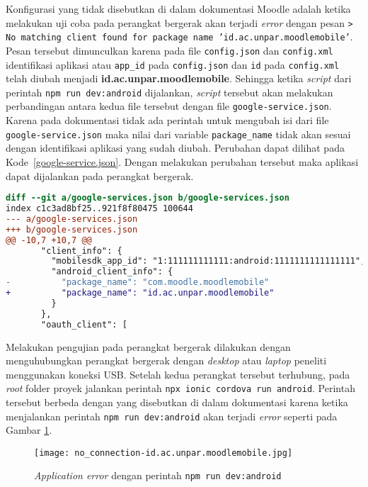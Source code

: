 Konfigurasi yang tidak disebutkan di dalam dokumentasi Moodle adalah ketika melakukan uji coba pada perangkat bergerak akan terjadi \textit{error} dengan pesan \texttt{> No matching client found for package name 'id.ac.unpar.moodlemobile'}. Pesan tersebut dimunculkan karena pada file \texttt{config.json} dan \texttt{config.xml} identifikasi aplikasi atau \texttt{app\_id} pada \texttt{config.json} dan \texttt{id} pada \texttt{config.xml} telah diubah menjadi \textbf{id.ac.unpar.moodlemobile}. Sehingga ketika \textit{script} dari perintah \texttt{npm run dev:android} dijalankan, \textit{script} tersebut akan melakukan perbandingan antara kedua file tersebut dengan file \texttt{google-service.json}. Karena pada dokumentasi tidak ada perintah untuk mengubah isi dari file \texttt{google-service.json} maka nilai dari variable \texttt{package\_name} tidak akan sesuai dengan identifikasi aplikasi yang sudah diubah. Perubahan dapat dilihat pada \mbox{Kode \ref{google-service.json}}. Dengan melakukan perubahan tersebut maka aplikasi dapat dijalankan pada perangkat bergerak.

\begin{lstlisting}[language = diff, frame=single, label ={google-service.json}, caption = Menyesuaikan \texttt{package\_name} dengan \texttt{app\_id} pada \texttt{google-service.json} ]
diff --git a/google-services.json b/google-services.json
index c1c3ad8bf25..921f8f80475 100644
--- a/google-services.json
+++ b/google-services.json
@@ -10,7 +10,7 @@
       "client_info": {
         "mobilesdk_app_id": "1:111111111111:android:1111111111111111",
         "android_client_info": {
-          "package_name": "com.moodle.moodlemobile"
+          "package_name": "id.ac.unpar.moodlemobile"
         }
       },
       "oauth_client": [
\end{lstlisting}

Melakukan pengujian pada perangkat bergerak dilakukan dengan menguhubungkan perangkat bergerak dengan \textit{desktop} atau \textit{laptop} peneliti menggunakan koneksi USB. Setelah kedua perangkat tersebut terhubung, pada \textit{root} folder proyek jalankan perintah \texttt{npx ionic cordova run android}. Perintah tersebut berbeda dengan yang disebutkan di dalam dokumentasi karena ketika menjalankan perintah \texttt{npm run dev:android} akan terjadi \textit{error} seperti pada Gambar \ref{app:error:no-connection}.

\begin{figure}[H] 
	\centering  
	\texttt{[image: no\_connection-id.ac.unpar.moodlemobile.jpg]}  
	\caption[\textit{Application error} dengan perintah \texttt{npm run dev:android}] {\textit{Application error} dengan perintah \texttt{npm run dev:android}} 
	\label{app:error:no-connection} 
\end{figure} 

